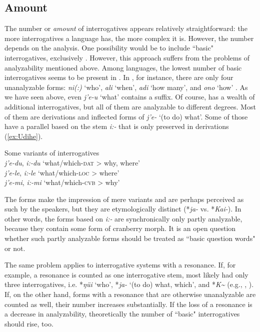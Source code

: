 \documentclass[output=paper,hidelinks]{langscibook}
\begin{document}
\subsection{Amount}
The number or \textit{amount} of interrogatives appears relatively straightforward: the more interrogatives a language has, the more complex it is. However, the number depends on the analysis. One possibility would be to include ``basic" interrogatives, exclusively \citep{Hengeveld2012}. However, this approach suffers from the problems of analyzability mentioned above. Among  languages, the lowest number of basic interrogatives seems to be present in . In , for instance, there are only four unanalyzable forms: \textit{ni(:)} `who', \textit{ali} `when', \textit{adi} `how many', and \textit{ono} `how' \citep{NikolaevaTolskaya2001}. As we have seen above, even \textit{j’e-u} `what' contains a suffix. Of course,  has a wealth of additional interrogatives, but all of them are analyzable to different degrees. Most of them are derivations and inflected forms of \textit{j’e-} `(to do) what'. Some of those have a parallel based on the stem \textit{i:-} that is only preserved in derivations (\ref{ex:Udihe}).

\ea\upshape
    \label{ex:Udihe}
    Some variants of  interrogatives \citep{NikolaevaTolskaya2001}\\
    \textit{j'e-du}, \textit{i:-du} `what/which-\textsc{dat} > why, where'\\
    \textit{j'e-le}, \textit{i:-le} `what/which-\textsc{loc} > where'\\
    \textit{j'e-mi}, \textit{i:-mi} `what/which-\textsc{cvb} > why'
    \z

\noindent The forms make the impression of mere variants and are perhaps perceived as such by the speakers, but they are etymologically distinct (*\textit{ja-} vs. *\textit{Kai-}). In other words, the forms based on \textit{i:-} are synchronically only partly analyzable, because they contain some form of cranberry morph. It is an open question whether such partly analyzable forms should be treated as ``basic question words" or not.

The same problem applies to interrogative systems with a resonance. If, for example, a resonance is counted as one interrogative stem,  most likely had only three interrogatives, i.e. *\textit{ŋüi} `who', *\textit{ja-} `(to do) what, which', and *\textit{K\textasciitilde} (e.g., \citealt{Benzing1956}, \citealt[312--330]{Hölzl2018b}). If, on the other hand, forms with a resonance that are otherwise unanalyzable are counted as well, their number increases substantially. If the loss of a resonance is a decrease in analyzability, theoretically the number of ``basic" interrogatives should rise, too.
\end{document}
